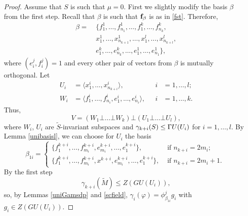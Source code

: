 \begin{proof}
Assume that $S$ is such that $\mu=0.$
First we slightly modify the basis $\beta$ from the first step. Recall that $\beta$ is such that 
$\bf f_{\beta}$ is as in \eqref{fst}. Therefore, 
\begin{equation*}
\begin{aligned}
\beta  =  & \; \{f_1^{1}, \ldots, f_{n_1}^1, \ldots, f_1^k, \ldots, f_{n_k}^k, \\ & \; x_1^1, \ldots, x_{n_{k+1}}^1, \ldots, x_1^l, \ldots, x_{n_{k+l}}^l,\\ & \; e_{1}^{k}, \ldots, e_{n_k}^k, \ldots, e_{1}^1, \ldots, e_{n_1}^1 \},
\end{aligned}
\end{equation*}
where $(e_i^j,f_i^j)=1$ and  every other pair of vectors from $\beta$ is mutually orthogonal.  Let 
\begin{equation}\label{basisW}
\begin{aligned}
U_i & =\langle x_1^i, \ldots, x_{n_{k+i}}^i \rangle, &\text{ } i&=1, \ldots, l;\\
W_i & =\langle f_1^i, \ldots, f_{n_{i}}^i,  e_{1}^i, \ldots, e_{n_{i}}^i \rangle, &\text{ } i&=1, \ldots, k. 
\end{aligned}
\end{equation}
Thus, $$V=(W_1 \bot \ldots \bot W_k) \bot (U_1 \bot \ldots \bot U_l),$$
where $W_i$, $U_i$ are $\tilde{S}$-invariant subspaces 
 and $\gamma_{k+i}(S) \le {{\Gamma U}}(U_i)$ for $i=1, \ldots, l$.  By Lemma \ref{unibasisl}, we can choose for $U_i$ the basis 
\begin{equation}\label{basisU}
\beta_{1i}=
\begin{cases} 
\{f_1^{k+i}, \ldots, f_{m_i}^{k+i}, e_{m_i}^{k+i}, \ldots, e_1^{k+i}\}, & \text{ if $n_{k+i}=2m_i$}; \\
\{f_1^{k+i}, \ldots, f_{m_i}^{k+i}, x^{k+i}, e_{m_i}^{k+i}, \ldots, e_1^{k+i}\}, & \text{ if $n_{k+i}=2m_i+1$. } 
\end{cases}
\end{equation} 
 By the first step
$$\gamma_{k+i}(\tilde{M}) \le  Z(GU(U_i)),$$
so, by Lemmas  \ref{uniGamsdp} and \ref{scfield}, $\gamma_i(\varphi)=\phi_{\beta_{1i}}^jg_i$ with $g_i \in Z(GU(U_i)).$


\end{proof}
